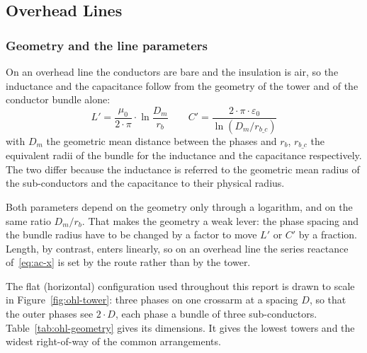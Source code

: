 \subsection{Overhead Lines}
\label{sec:ohl}

\subsubsection{Geometry and the line parameters}
\label{sec:ohl-geometry}

On an overhead line the conductors are bare and the insulation is air, so
the inductance and the capacitance follow from the geometry of the tower and
of the conductor bundle alone:
\begin{equation}
  L' = \frac{\mu_0}{2 \cdot \pi} \cdot \ln\frac{D_m}{r_b}
  \qquad
  C' = \frac{2 \cdot \pi \cdot \varepsilon_0}{\ln\left(D_m / r_{b\_c}\right)}
  \label{eq:ohl-lc}
\end{equation}
with $D_m$ the geometric mean distance between the phases and $r_b$,
$r_{b\_c}$ the equivalent radii of the bundle for the inductance and the
capacitance respectively. The two differ because the inductance is referred
to the geometric mean radius of the sub-conductors and the capacitance to
their physical radius.

Both parameters depend on the geometry only through a logarithm, and on the
same ratio $D_m / r_b$. That makes the geometry a weak lever: the phase
spacing and the bundle radius have to be changed by a factor to move $L'$ or
$C'$ by a fraction. Length, by contrast, enters linearly, so on an overhead
line the series reactance of~\eqref{eq:ac-x} is set by the route rather
than by the tower.

The flat (horizontal) configuration used throughout this report is drawn to
scale in Figure~\ref{fig:ohl-tower}: three phases on one crossarm at a
spacing $D$, so that the outer phases see $2 \cdot D$, each phase a bundle
of three sub-conductors. Table~\ref{tab:ohl-geometry} gives its dimensions.
It gives the lowest towers and the widest right-of-way of the common
arrangements.

